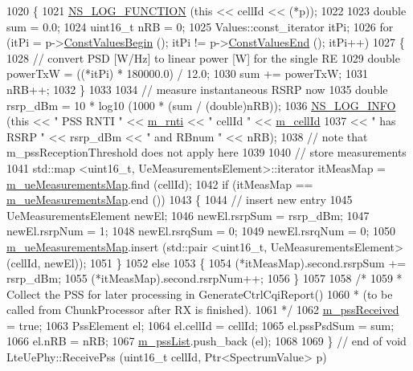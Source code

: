 \begin{DoxyCode}
1020 \{
1021   \hyperlink{log-macros-disabled_8h_a90b90d5bad1f39cb1b64923ea94c0761}{NS\_LOG\_FUNCTION} (\textcolor{keyword}{this} << cellId << (*p));
1022 
1023   \textcolor{keywordtype}{double} sum = 0.0;
1024   uint16\_t nRB = 0;
1025   Values::const\_iterator itPi;
1026   \textcolor{keywordflow}{for} (itPi = p->\hyperlink{classns3_1_1SpectrumValue_aad6900431bd0554b3ba9a00691c2393b}{ConstValuesBegin} (); itPi != p->\hyperlink{classns3_1_1SpectrumValue_ab5c2fbde4e06be7c0e4d7a0755c607be}{ConstValuesEnd} (); itPi++)
1027     \{
1028       \textcolor{comment}{// convert PSD [W/Hz] to linear power [W] for the single RE}
1029       \textcolor{keywordtype}{double} powerTxW = ((*itPi) * 180000.0) / 12.0;
1030       sum += powerTxW;
1031       nRB++;
1032     \}
1033 
1034   \textcolor{comment}{// measure instantaneous RSRP now}
1035   \textcolor{keywordtype}{double} rsrp\_dBm = 10 * log10 (1000 * (sum / (\textcolor{keywordtype}{double})nRB));
1036   \hyperlink{group__logging_gafbd73ee2cf9f26b319f49086d8e860fb}{NS\_LOG\_INFO} (\textcolor{keyword}{this} << \textcolor{stringliteral}{" PSS RNTI "} << \hyperlink{classns3_1_1LteUePhy_a887b5dc4e246a308cd09127b64ed8fac}{m\_rnti} << \textcolor{stringliteral}{" cellId "} << 
      \hyperlink{classns3_1_1LtePhy_ac53d10d27f1bde64807a3ff366662787}{m\_cellId}
1037                     << \textcolor{stringliteral}{" has RSRP "} << rsrp\_dBm << \textcolor{stringliteral}{" and RBnum "} << nRB);
1038   \textcolor{comment}{// note that m\_pssReceptionThreshold does not apply here}
1039 
1040   \textcolor{comment}{// store measurements}
1041   std::map <uint16\_t, UeMeasurementsElement>::iterator itMeasMap = 
      \hyperlink{classns3_1_1LteUePhy_a3d064f4bdc58614aa1e12c44a8ec111b}{m\_ueMeasurementsMap}.find (cellId);
1042   \textcolor{keywordflow}{if} (itMeasMap == \hyperlink{classns3_1_1LteUePhy_a3d064f4bdc58614aa1e12c44a8ec111b}{m\_ueMeasurementsMap}.end ())
1043     \{
1044       \textcolor{comment}{// insert new entry}
1045       UeMeasurementsElement newEl;
1046       newEl.rsrpSum = rsrp\_dBm;
1047       newEl.rsrpNum = 1;
1048       newEl.rsrqSum = 0;
1049       newEl.rsrqNum = 0;
1050       \hyperlink{classns3_1_1LteUePhy_a3d064f4bdc58614aa1e12c44a8ec111b}{m\_ueMeasurementsMap}.insert (std::pair <uint16\_t, UeMeasurementsElement> (cellId, 
      newEl));
1051     \}
1052   \textcolor{keywordflow}{else}
1053     \{
1054       (*itMeasMap).second.rsrpSum += rsrp\_dBm;
1055       (*itMeasMap).second.rsrpNum++;
1056     \}
1057 
1058   \textcolor{comment}{/*}
1059 \textcolor{comment}{   * Collect the PSS for later processing in GenerateCtrlCqiReport()}
1060 \textcolor{comment}{   * (to be called from ChunkProcessor after RX is finished).}
1061 \textcolor{comment}{   */}
1062   \hyperlink{classns3_1_1LteUePhy_a5ab022b1bccbff633af1f2189b68305a}{m\_pssReceived} = \textcolor{keyword}{true};
1063   PssElement el;
1064   el.cellId = cellId;
1065   el.pssPsdSum = sum;
1066   el.nRB = nRB;
1067   \hyperlink{classns3_1_1LteUePhy_a65bf8a30d9bdcfbe5f8e2faac4007406}{m\_pssList}.push\_back (el);
1068 
1069 \} \textcolor{comment}{// end of void LteUePhy::ReceivePss (uint16\_t cellId, Ptr<SpectrumValue> p)}
\end{DoxyCode}


